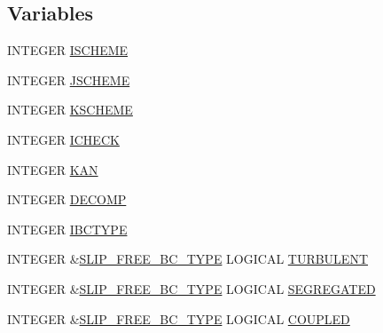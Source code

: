 \subsection*{Variables}
\begin{DoxyCompactItemize}
\item 
I\-N\-T\-E\-G\-E\-R \hyperlink{msa20_2home_2abonfi_2_c_f_d__codes_2_eul_f_s_83_82_83_2include_2flags_8com_a2a5c33e10743241daf1d588271535cbd}{I\-S\-C\-H\-E\-M\-E}
\item 
I\-N\-T\-E\-G\-E\-R \hyperlink{msa20_2home_2abonfi_2_c_f_d__codes_2_eul_f_s_83_82_83_2include_2flags_8com_a32a272519d99a00902b1eaaf0e414a3b}{J\-S\-C\-H\-E\-M\-E}
\item 
I\-N\-T\-E\-G\-E\-R \hyperlink{msa20_2home_2abonfi_2_c_f_d__codes_2_eul_f_s_83_82_83_2include_2flags_8com_a1497ba5bd352e40e64c77b8ecdef0359}{K\-S\-C\-H\-E\-M\-E}
\item 
I\-N\-T\-E\-G\-E\-R \hyperlink{msa20_2home_2abonfi_2_c_f_d__codes_2_eul_f_s_83_82_83_2include_2flags_8com_a3f6a9bb8769dae15e695bb75c800ce6a}{I\-C\-H\-E\-C\-K}
\item 
I\-N\-T\-E\-G\-E\-R \hyperlink{msa20_2home_2abonfi_2_c_f_d__codes_2_eul_f_s_83_82_83_2include_2flags_8com_a64e8ba58ac03464480c792d64845921c}{K\-A\-N}
\item 
I\-N\-T\-E\-G\-E\-R \hyperlink{msa20_2home_2abonfi_2_c_f_d__codes_2_eul_f_s_83_82_83_2include_2flags_8com_ae0fd3585723edf991a009a4b80d1af6b}{D\-E\-C\-O\-M\-P}
\item 
I\-N\-T\-E\-G\-E\-R \hyperlink{msa20_2home_2abonfi_2_c_f_d__codes_2_eul_f_s_83_82_83_2include_2flags_8com_a99bc750a49323d46f53d2946b908caef}{I\-B\-C\-T\-Y\-P\-E}
\item 
I\-N\-T\-E\-G\-E\-R \&\hyperlink{home_2abonfi_2_c_f_d__codes_2_eul_f_s_83_84_2include_2flags_8com_a6beb6f16ff7301fc1f9a031b0f564045}{S\-L\-I\-P\-\_\-\-F\-R\-E\-E\-\_\-\-B\-C\-\_\-\-T\-Y\-P\-E} L\-O\-G\-I\-C\-A\-L \hyperlink{msa20_2home_2abonfi_2_c_f_d__codes_2_eul_f_s_83_82_83_2include_2flags_8com_a3dc8a7a40b9134816acc7fab3b0f6c78}{T\-U\-R\-B\-U\-L\-E\-N\-T}
\item 
I\-N\-T\-E\-G\-E\-R \&\hyperlink{home_2abonfi_2_c_f_d__codes_2_eul_f_s_83_84_2include_2flags_8com_a6beb6f16ff7301fc1f9a031b0f564045}{S\-L\-I\-P\-\_\-\-F\-R\-E\-E\-\_\-\-B\-C\-\_\-\-T\-Y\-P\-E} L\-O\-G\-I\-C\-A\-L \hyperlink{msa20_2home_2abonfi_2_c_f_d__codes_2_eul_f_s_83_82_83_2include_2flags_8com_addb980bd039b036e2c31c29d15b564cd}{S\-E\-G\-R\-E\-G\-A\-T\-E\-D}
\item 
I\-N\-T\-E\-G\-E\-R \&\hyperlink{home_2abonfi_2_c_f_d__codes_2_eul_f_s_83_84_2include_2flags_8com_a6beb6f16ff7301fc1f9a031b0f564045}{S\-L\-I\-P\-\_\-\-F\-R\-E\-E\-\_\-\-B\-C\-\_\-\-T\-Y\-P\-E} L\-O\-G\-I\-C\-A\-L \hyperlink{msa20_2home_2abonfi_2_c_f_d__codes_2_eul_f_s_83_82_83_2include_2flags_8com_ac317e5d3b1db579b5207ebd5d4b26af3}{C\-O\-U\-P\-L\-E\-D}

\end{DoxyCompactItemize}
